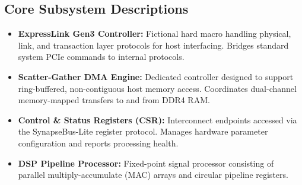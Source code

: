 \begin{tcolorbox}
\end{tcolorbox}

\subsection{Core Subsystem Descriptions}
\begin{itemize}
    \item \textbf{ExpressLink Gen3 Controller:} Fictional hard macro handling physical, link, and transaction layer protocols for host interfacing. Bridges standard system PCIe commands to internal protocols.
    \item \textbf{Scatter-Gather DMA Engine:} Dedicated controller designed to support ring-buffered, non-contiguous host memory access. Coordinates dual-channel memory-mapped transfers to and from DDR4 RAM.
    \item \textbf{Control \& Status Registers (CSR):} Interconnect endpoints accessed via the SynapseBus-Lite register protocol. Manages hardware parameter configuration and reports processing health.
    \item \textbf{DSP Pipeline Processor:} Fixed-point signal processor consisting of parallel multiply-accumulate (MAC) arrays and circular pipeline registers.
\end{itemize}

